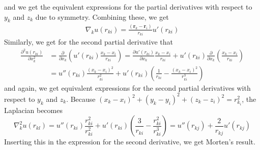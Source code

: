 \documentclass[%
oneside,                 %
final,                   %
10pt]{article}
\begin{document}
and we get the equivalent expressions for the partial derivatives with respect to $y_k$ and $z_k$ due to symmetry. Combining these, we get 
\begin{align*}
    \nabla_k u(r_{ki})=\frac{(\mathbf{r}_k-\mathbf{r}_i)}{r_{ki}}u'(r_{ki})
\end{align*}
Similarly, we get for the second partial derivative that 
\begin{align*}
    \frac{\partial^2 u(r_{ki})}{\partial x_k^2}&=\frac{\partial }{\partial x_k}\left(u'(r_{ki})\frac{x_k-x_i}{r_{ki}}\right)= \frac{\partial u'(r_{ki})}{\partial x_k}\frac{x_k-x_i}{r_{ki}}+u'(r_{ki})\frac{\partial }{\partial x_k}\left(\frac{x_k-x_i}{r_{ki}}\right)\\ &= u''(r_{ki})\frac{(x_k-x_i)^2}{r_{ki}^2}+u'(r_{ki})\left(\frac{1}{r_{ki}}-\frac{(x_k-x_i)^2}{r_{ki}^3}\right)
\end{align*}
and again, we get equivalent expressions for the second partial derivatives with respect to $y_k$ and $z_k$. Because $(x_k-x_i)^2+(y_k-y_i)^2+(z_k-z_i)^2=r_{k_i}^2$, the Laplacian becomes
\begin{equation*}
    \nabla_k^2 u(r_{kl})=u''(r_{ki})\frac{r_{ki}^2}{r_{ki}^2}+u'(r_{ki})\left(\frac{3}{r_{ki}}-\frac{r_{ki}^2}{r_{ki}^3}\right)= u''(r_{kj})+\frac{2}{r_{kj}}u'(r_{kj})
\end{equation*}
Inserting this in the expression for the second derivative, we get Morten's result.
\end{document}
